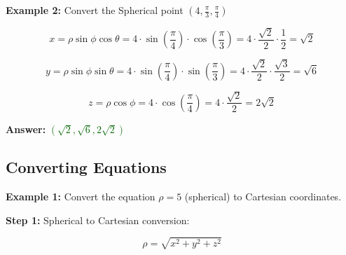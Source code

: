 \documentclass[10pt]{article}                               %
\begin{document}
\begin{adjustwidth}{2em}{0pt}
\begin{adjustwidth}{2em}{0pt}
\begin{examplebox}
\begin{adjustwidth}{2em}{0pt}
                \end{adjustwidth}

                \break

                \textbf{Example 2:} Convert the Spherical point \( \left(4, \frac{\pi}{3}, \frac{\pi}{4}\right) \)
                \vspace{0.5em}

                \begin{adjustwidth}{2em}{0pt}

                    \[ x = \rho\sin\phi\cos\theta = 4 \cdot \sin\left(\frac{\pi}{4}\right) \cdot \cos\left(\frac{\pi}{3}\right) = 4 \cdot \frac{\sqrt{2}}{2} \cdot \frac{1}{2} = \sqrt{2} \]

                    \[ y = \rho\sin\phi\sin\theta = 4 \cdot \sin\left(\frac{\pi}{4}\right) \cdot \sin\left(\frac{\pi}{3}\right) = 4 \cdot \frac{\sqrt{2}}{2} \cdot \frac{\sqrt{3}}{2} = \sqrt{6} \]

                    \[ z = \rho\cos\phi = 4 \cdot \cos\left(\frac{\pi}{4}\right) = 4 \cdot \frac{\sqrt{2}}{2} = 2\sqrt{2} \]

                    \textbf{Answer:} \textcolor{darkgreen}{\( \left(\sqrt{2}, \sqrt{6}, 2\sqrt{2}\right) \)}

                \end{adjustwidth}

            \end{examplebox}

            \begin{examplebox}
        
                \subsection*{Converting Equations}
            
                \textbf{Example 1:} Convert the equation \( \rho = 5 \) (spherical) to Cartesian coordinates.
                \vspace{0.5em}
            
                \begin{adjustwidth}{2em}{0pt}
            
                    \textbf{Step 1:} Spherical to Cartesian conversion:
            
                    \vspace{0.25em}
            
                    \[ \rho = \sqrt{x^2 + y^2 + z^2} \]
            

\end{adjustwidth}
\end{examplebox}
\end{adjustwidth}
\end{adjustwidth}
\end{document}

